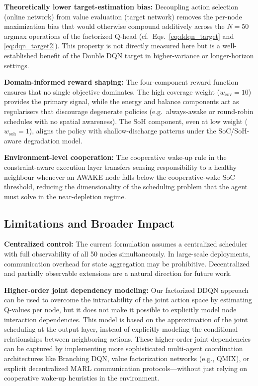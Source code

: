\documentclass[journal]{IEEEtran}
\begin{document}
\textbf{Theoretically lower target-estimation bias:} Decoupling action
selection (online network) from value evaluation (target network)
removes the per-node maximization bias that would otherwise compound
additively across the $N = 50$ argmax operations of the factorized
Q-head (cf.\ Eqs.~\eqref{eq:ddqn_target} and \eqref{eq:dqn_target2}).
This property is not directly measured here but is a well-established
benefit of the Double DQN target in higher-variance or
longer-horizon settings.

\textbf{Domain-informed reward shaping:} The four-component reward
function ensures that no single objective dominates. The high
coverage weight ($w_{\text{cov}} = 10$) provides the primary signal,
while the energy and balance components act as regularisers that
discourage degenerate policies (e.g.\ always-awake or round-robin
schedules with no spatial awareness). The SoH component, even at low
weight ($w_{\text{soh}} = 1$), aligns the policy with shallow-discharge
patterns under the SoC/SoH-aware degradation model.

\textbf{Environment-level cooperation:} The cooperative wake-up rule in
the constraint-aware execution layer transfers sensing responsibility
to a healthy neighbour whenever an AWAKE node falls below the
cooperative-wake SoC threshold, reducing the dimensionality of the
scheduling problem that the agent must solve in the
near-depletion regime.

\subsection{Limitations and Broader Impact}

\textbf{Centralized control:} The current formulation assumes a centralized scheduler with full observability of all 50 nodes simultaneously. In large-scale deployments, communication overhead for state aggregation may be prohibitive. Decentralized and partially observable extensions are a natural direction for future work.

\textbf{Higher-order joint dependency modeling:} Our factorized DDQN approach can be used to overcome the intractability of the joint action space by estimating Q-values per node, but it does not make it possible to explicitly model node interaction dependencies. This model is based on the approximation of the joint scheduling at the output layer, instead of explicitly modeling the conditional relationships between neighboring actions. These higher-order joint dependencies can be captured by implementing more sophisticated multi-agent coordination architectures like Branching DQN, value factorization networks (e.g., QMIX), or explicit decentralized MARL communication protocols---without just relying on cooperative wake-up heuristics in the environment.
\end{document}
